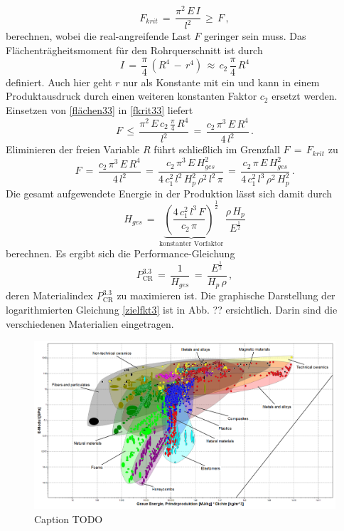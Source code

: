 \begin{equation}\label{fkrit33}
F_{krit}\,=\,\frac{\pi^2\,E\,I}{l^2}\,\ge\,F\,,
\end{equation}
berechnen, wobei die real-angreifende Last $F$ geringer sein muss.
Das Flächenträgheitsmoment für den Rohrquerschnitt ist durch
\begin{equation}\label{flächen33}
I\,=\,\frac{\pi}{4}\,\left(R^4\,-\,r^4\right)\,\approx\,c_2\,\frac{\pi}{4}\,R^4
\end{equation}
definiert. Auch hier geht $r$ nur als Konstante mit ein und kann in einem Produktausdruck durch einen weiteren konstanten Faktor $c_2$ ersetzt werden. Einsetzen von \ref{flächen33} in \ref{fkrit33} liefert
\begin{equation}
F\,\le\,\frac{\pi^2\,E\,c_2\,\frac{\pi}{4}\,R^4}{l^2}\,=\,\frac{c_2\,\pi^3\,E\,R^4}{4\,l^2}\,.
\end{equation}
Eliminieren der freien Variable $R$ führt schließlich im Grenzfall $F\,=\,F_{krit}$ zu
\begin{equation}
F\,=\,\frac{c_2\,\pi^3\,E\,R^4}{4\,l^2}\,=\,\frac{c_2\,\pi^3\,E\,H_{ges}^2}{4\,c_1^2\,l^2\,H_p^2\,\rho^2\,l^2\,\pi}\,=\,\frac{c_2\,\pi\,E\,H_{ges}^2}{4\,c_1^2\,l^3\,\rho^2\,H_p^2}\,.
\end{equation}
Die gesamt aufgewendete Energie in der Produktion lässt sich damit durch
\begin{equation}
H_{ges}\,=\,\underbrace{\left(\frac{4\,c_1^2\,l^3\,F}{c_2\,\pi}\right)^\frac{1}{2}}_{\text{konstanter Vorfaktor}}\,\frac{\rho\,H_p}{E^\frac{1}{2}}
\end{equation}
berechnen.
Es ergibt sich die Performance-Gleichung
\begin{equation} \label{zielfkt3}
P_{\text{CR}}^{3.3}\,=\,\frac{1}{H_{ges}}\,=\,\frac{E^\frac{1}{2}}{H_p\,\rho}\,,
\end{equation}
deren Materialindex $P_{\text{CR}}^{3.3}$ zu maximieren ist. Die graphische Darstellung der logarithmierten Gleichung \ref{zielfkt3} ist in Abb. ?? ersichtlich. Darin sind die verschiedenen Materialien eingetragen.\\
\begin{figure}[H]
	\centering
	\includegraphics[width=1.0\linewidth]{chapter/Bilder/3_3_1}
	\caption{Caption TODO}
	\label{fig:ces_3_3_1}
\end{figure}
